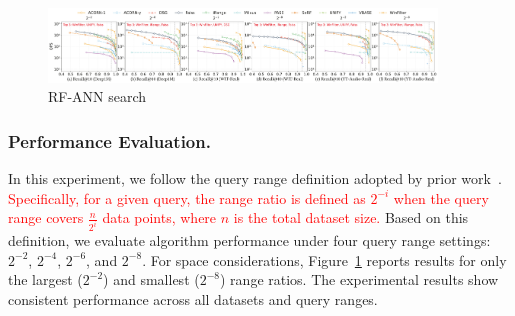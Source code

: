 \documentclass[sigconf, nonacm]{acmart}
\begin{document}
	\begin{figure}[t]
		
		\centering
		
		\includegraphics[width=0.92\textwidth]{figures/exp/exp_8_2.pdf}
		\caption{RF-ANN search }
		\label{fig:exp_8_2}
	\end{figure}
	
	
	\subsubsection{Performance Evaluation. }
	
	In this experiment, we follow the query range definition adopted by prior work~\cite{HQI}. \textcolor{red}{Specifically, for a given query, the range ratio is defined as $2^{-i}$	when the query range covers $\frac{n}{2^i}$ data points, where $n$ is the total dataset size.}
	Based on this definition, we evaluate algorithm performance under four query range settings: $2^{-2}$, $2^{-4}$, $2^{-6}$, and $2^{-8}$. For space considerations, Figure~\ref{fig:exp_8_2} reports results for only the largest ($2^{-2}$) and smallest ($2^{-8}$) range ratios. The experimental results show consistent performance across all datasets and query ranges.
	
	
\end{document}
